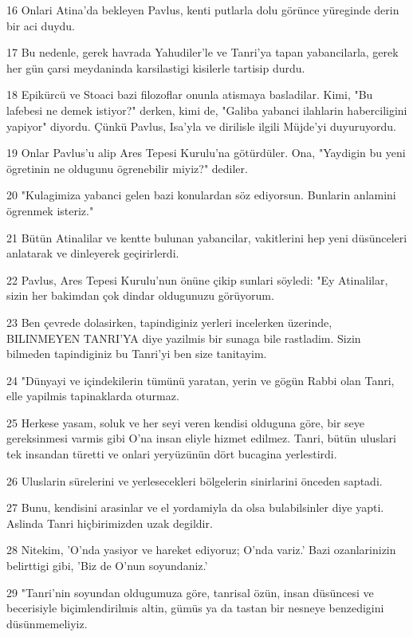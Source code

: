 \par 16 Onlari Atina'da bekleyen Pavlus, kenti putlarla dolu görünce yüreginde derin bir aci duydu.
\par 17 Bu nedenle, gerek havrada Yahudiler'le ve Tanri'ya tapan yabancilarla, gerek her gün çarsi meydaninda karsilastigi kisilerle tartisip durdu.
\par 18 Epikürcü ve Stoaci bazi filozoflar onunla atismaya basladilar. Kimi, "Bu lafebesi ne demek istiyor?" derken, kimi de, "Galiba yabanci ilahlarin haberciligini yapiyor" diyordu. Çünkü Pavlus, Isa'yla ve dirilisle ilgili Müjde'yi duyuruyordu.
\par 19 Onlar Pavlus'u alip Ares Tepesi Kurulu'na götürdüler. Ona, "Yaydigin bu yeni ögretinin ne oldugunu ögrenebilir miyiz?" dediler.
\par 20 "Kulagimiza yabanci gelen bazi konulardan söz ediyorsun. Bunlarin anlamini ögrenmek isteriz."
\par 21 Bütün Atinalilar ve kentte bulunan yabancilar, vakitlerini hep yeni düsünceleri anlatarak ve dinleyerek geçirirlerdi.
\par 22 Pavlus, Ares Tepesi Kurulu'nun önüne çikip sunlari söyledi: "Ey Atinalilar, sizin her bakimdan çok dindar oldugunuzu görüyorum.
\par 23 Ben çevrede dolasirken, tapindiginiz yerleri incelerken üzerinde, BILINMEYEN TANRI'YA diye yazilmis bir sunaga bile rastladim. Sizin bilmeden tapindiginiz bu Tanri'yi ben size tanitayim.
\par 24 "Dünyayi ve içindekilerin tümünü yaratan, yerin ve gögün Rabbi olan Tanri, elle yapilmis tapinaklarda oturmaz.
\par 25 Herkese yasam, soluk ve her seyi veren kendisi olduguna göre, bir seye gereksinmesi varmis gibi O'na insan eliyle hizmet edilmez. Tanri, bütün uluslari tek insandan türetti ve onlari yeryüzünün dört bucagina yerlestirdi.
\par 26 Uluslarin sürelerini ve yerlesecekleri bölgelerin sinirlarini önceden saptadi.
\par 27 Bunu, kendisini arasinlar ve el yordamiyla da olsa bulabilsinler diye yapti. Aslinda Tanri hiçbirimizden uzak degildir.
\par 28 Nitekim, 'O'nda yasiyor ve hareket ediyoruz; O'nda variz.' Bazi ozanlarinizin belirttigi gibi, 'Biz de O'nun soyundaniz.'
\par 29 "Tanri'nin soyundan oldugumuza göre, tanrisal özün, insan düsüncesi ve becerisiyle biçimlendirilmis altin, gümüs ya da tastan bir nesneye benzedigini düsünmemeliyiz.
